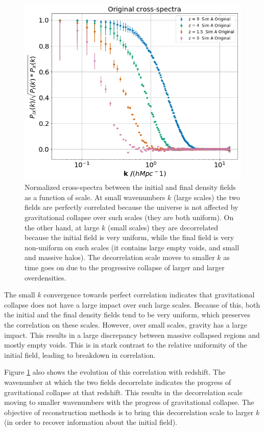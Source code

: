 \begin{figure}
    \centering
    \includegraphics[width=1\columnwidth]{images/perfRecon/orig.png}%
    
    \caption{
    Normalized cross-spectra between the initial and final density fields as a function of scale. At small wavenumbers $k$ (large scales) the two fields are perfectly correlated because the universe is not affected by gravitational collapse over such scales (they are both uniform). On the other hand, at large $k$ (small scales) they are decorrelated because the initial field is very uniform, while the final field is very non-uniform on such scales (it contains large empty voids, and small and massive halos). The decorrelation scale moves to smaller $k$ as time goes on due to the progressive collapse of larger and larger overdensities.
    }
    
    \label{fig:3.1}
\end{figure}

The small $k$ convergence towards perfect correlation indicates that gravitational collapse does not have a large impact over such large scales. Because of this, both the initial and the final density fields tend to be very uniform, which preserves the correlation on these scales. However, over small scales, gravity has a large impact. This results in a large discrepancy between massive collapsed regions and mostly empty voids. This is in stark contrast to the relative uniformity of the initial field, leading to breakdown in correlation.

Figure \ref{fig:3.1} also shows the evolution of this correlation with redshift. The wavenumber at which the two fields decorrelate indicates the progress of gravitational collapse at that redshift. This results in the decorrelation scale moving to smaller wavenumbers with the progress of gravitational collapse. The objective of reconstruction methods is to bring this decorrelation scale to larger $k$ (in order to recover information about the initial field).

